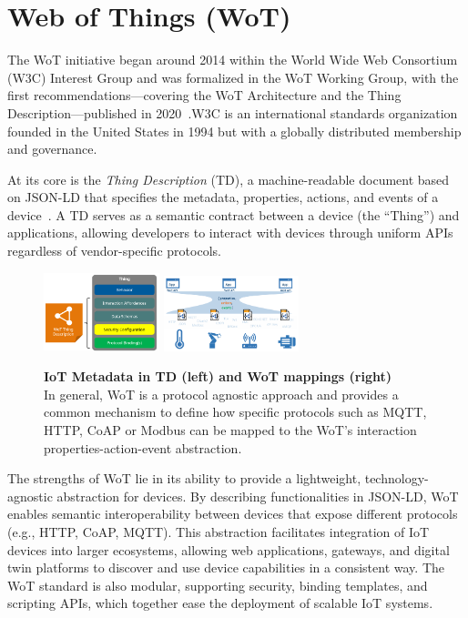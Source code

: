 \section{Web of Things (WoT)}

The WoT initiative began around 2014 within the World Wide Web Consortium (W3C) Interest Group
and was formalized in the WoT Working Group, with the first
recommendations—covering the WoT Architecture and the Thing
Description—published in 2020~\cite{W3CWOT2020}.W3C is an international standards
organization founded in the United States in 1994 but with a
globally distributed membership and governance.

At its core is the \emph{Thing Description} (TD), a machine-readable
document based on JSON-LD that specifies the metadata, properties,
actions, and events of a device~\cite{W3CWOT2020}. A TD serves as a
semantic contract between a device (the “Thing”) and applications,
allowing developers to interact with devices through uniform APIs
regardless of vendor-specific protocols.

\begin{figure}[ht]
    \centering
    \includegraphics[width=0.3\textwidth]{Images/td.png}
    \includegraphics[width=0.35\textwidth]{Images/wot-mappings.png}
    \caption{\textbf{IoT Metadata in TD (left) and WoT mappings (right)} \\In general, WoT is a protocol agnostic approach and provides a common mechanism to define how specific protocols such as MQTT, HTTP, CoAP or Modbus can be mapped to the WoT's interaction properties-action-event abstraction.~\cite{W3CWOT2020}}
    \label{fig:image2}
\end{figure}


The strengths of WoT lie in its ability to provide a lightweight,
technology-agnostic abstraction for devices. By describing
functionalities in JSON-LD, WoT enables semantic interoperability
between devices that expose different protocols (e.g., HTTP, CoAP,
MQTT). This abstraction facilitates integration of IoT devices into
larger ecosystems, allowing web applications, gateways, and digital
twin platforms to discover and use device capabilities in a consistent
way. The WoT standard is also modular, supporting security,
binding templates, and scripting APIs, which together ease the
deployment of scalable IoT systems.

